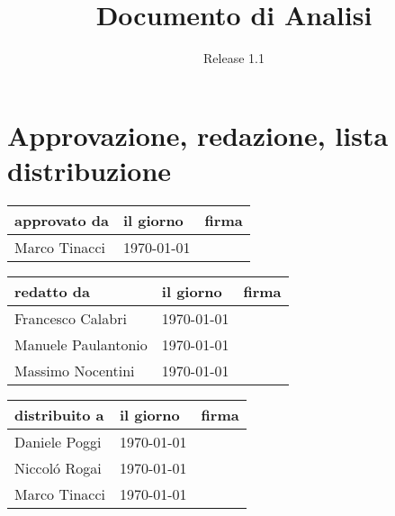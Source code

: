 \documentclass[a4paper, 12pt]{report}
\title{Documento di Analisi}
\author{Release 1.1}
\date{\today \\Firenze \\\begin{figure}[h] \centering
\texttt{[image: ../../images/logokiwi.png]} \end{figure} }
\begin{document}
\maketitle

\section*{Approvazione, redazione, lista distribuzione}
\begin{table}[h!]
  \begin{center}
    \begin{tabular}{| l | l | p{60mm} |}
    \hline
    \textbf{approvato da} & \textbf{il giorno} & \textbf{firma} \\
	\hline    
	Marco Tinacci & \today &  \\
    \hline
    \end{tabular}
  \end{center}
\end{table}

\begin{table}[h!]
  \begin{center}
    \begin{tabular}{| l | l | p{60mm} |}
    \hline
    \textbf{redatto da} & \textbf{il giorno} & \textbf{firma} \\
    \hline
    Francesco Calabri & \today &  \\
    \hline
	Manuele Paulantonio & \today &  \\
    \hline    
	Massimo Nocentini & \today &  \\
    \hline
    \end{tabular}
  \end{center}
\end{table}

\begin{table}[h!]
  \begin{center}
    \begin{tabular}{| l | l | p{60mm} |}
    \hline
    \textbf{distribuito a} & \textbf{il giorno} & \textbf{firma} \\
	\hline    
	Daniele Poggi & \today &  \\
    \hline
	Niccol\'o Rogai & \today &  \\
    \hline
	Marco Tinacci & \today &  \\
    \hline
    \end{tabular}
  \end{center}
\end{table}
\end{document}
